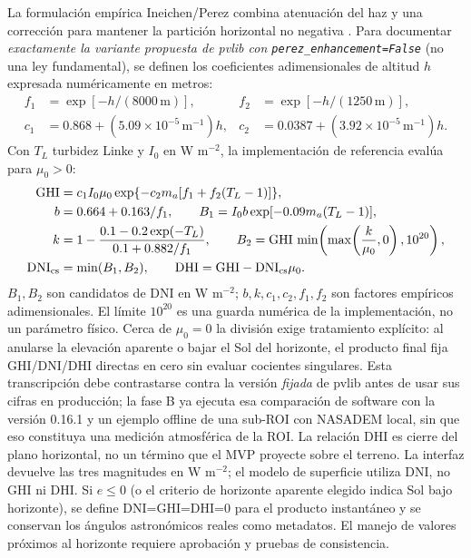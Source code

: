 \documentclass[11pt,a4paper]{article}
\begin{document}
La formulación empírica Ineichen/Perez combina atenuación del haz y una corrección para mantener la partición horizontal no negativa \cite{ineichen2002,pvlibineichen,pvlibsource}. Para documentar \emph{exactamente la variante propuesta de pvlib con \texttt{perez\_enhancement=False}} (no una ley fundamental), se definen los coeficientes adimensionales de altitud $h$ expresada numéricamente en metros:
\begin{align}
 f_1&=\exp[-h/(8000\,\mathrm m)],& f_2&=\exp[-h/(1250\,\mathrm m)],\\
 c_1&=0.868+(5.09\times10^{-5}\,\mathrm m^{-1})h,&c_2&=0.0387+(3.92\times10^{-5}\,\mathrm m^{-1})h.\label{eq:ineichen-coeff}
\end{align}
Con $T_L$ turbidez Linke y $I_0$ en W m$^{-2}$, la implementación de referencia evalúa para $\mu_0>0$:
\begin{align}
 \mathrm{GHI}&=c_1 I_0\mu_0\exp\{-c_2m_a[f_1+f_2(T_L-1)]\},\label{eq:ghi}\\
 b&=0.664+0.163/f_1,\qquad B_1=I_0 b\exp[-0.09m_a(T_L-1)],\label{eq:beam1}\\
 k&=1-\frac{0.1-0.2\exp(-T_L)}{0.1+0.882/f_1},\qquad
 B_2=\mathrm{GHI}\,\min\!\left(\max\!\left(\frac{k}{\mu_0},0\right),10^{20}\right),\label{eq:beam2}\\
 \mathrm{DNI}_{\rm cs}&=\min(B_1,B_2),\qquad
 \mathrm{DHI}=\mathrm{GHI}-\mathrm{DNI}_{\rm cs}\mu_0.\label{eq:dni}
\end{align}
$B_1,B_2$ son candidatos de DNI en W m$^{-2}$; $b,k,c_1,c_2,f_1,f_2$ son factores empíricos adimensionales. El límite $10^{20}$ es una guarda numérica de la implementación, no un parámetro físico. Cerca de $\mu_0=0$ la división exige tratamiento explícito: al anularse la elevación aparente o bajar el Sol del horizonte, el producto final fija GHI/DNI/DHI directas en cero sin evaluar cocientes singulares. Esta transcripción debe contrastarse contra la versión \emph{fijada} de pvlib antes de usar sus cifras en producción; la fase B ya ejecuta esa comparación de software con la versión 0.16.1 y un ejemplo offline de una sub-ROI con NASADEM local, sin que eso constituya una medición atmosférica de la ROI. La relación DHI es cierre del plano horizontal, no un término que el MVP proyecte sobre el terreno. La interfaz devuelve las tres magnitudes en W m$^{-2}$; el modelo de superficie utiliza DNI, no GHI ni DHI. Si $e\leq0$ (o el criterio de horizonte aparente elegido indica Sol bajo horizonte), se define DNI=GHI=DHI=0 para el producto instantáneo y se conservan los ángulos astronómicos reales como metadatos. El manejo de valores próximos al horizonte requiere aprobación y pruebas de consistencia.
\end{document}

